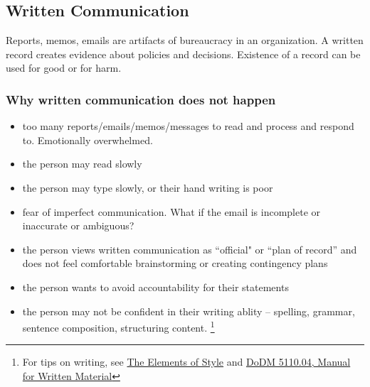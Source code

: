 \subsection{Written Communication\label{sec:written-communication}}

Reports, memos, emails are artifacts of bureaucracy in an organization. A written record creates evidence about policies and decisions. Existence of a record can be used for good or for harm.







\subsubsection{Why written communication does not happen\label{sec:written-comm-does-not-happen}}
\begin{itemize}
    \item too many reports/emails/memos/messages to read and process and respond to. Emotionally overwhelmed.
\item the person may read slowly
\item the person may type slowly, or their hand writing is poor
\item fear of imperfect communication. What if the email is incomplete or inaccurate or ambiguous?
\item the person views written communication as ``official" or ``plan of record'' and does not feel comfortable brainstorming or creating contingency plans
\item the person wants to avoid accountability for their statements
\item the person may not be confident in their writing ablity -- spelling, grammar, sentence composition, structuring content. \footnote{For tips on writing, see 
\href{https://en.wikipedia.org/wiki/The_Elements_of_Style}{The Elements of Style}
and
\href{https://www.google.com/search?q=dodm+5110.04}{DoDM 5110.04, Manual for Written Material}}
\end{itemize}

